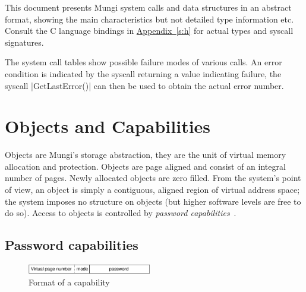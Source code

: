 \documentclass[a4paper,11pt,twoside,dvips]{report}
\begin{document}
This document presents Mungi system calls and data structures in an
abstract format, showing the main characteristics but not detailed type
information etc. Consult the C language bindings in
\hyperref[s:h]{Appendix~\ref*{s:h}} for actual types and syscall
signatures.

The system call tables show possible failure modes of various calls. An
error condition is indicated by the syscall returning a value indicating
failure, the syscall |GetLastError()| can then be used to obtain the
actual error number.

\chapter{\label{s:obj+caps}Objects and Capabilities}

Objects are Mungi's storage abstraction, they are the unit of virtual
memory allocation and protection. Objects are page aligned and consist
of an integral number of pages. Newly allocated objects are zero
filled. From the system's point of view, an object is simply a
contiguous, aligned region of virtual address space; the system imposes
no structure on objects (but higher software levels are free to do
so). Access to objects is controlled by \emph{password
capabilities}~\cite{Anderson_PW_86}.

\section{\label{s:caps}Password capabilities}

\begin{figure}[htb]
\begin{center}
\includegraphics[width=0.48\textwidth]{cap}
\end{center}
\caption{\label{f:cap}Format of a capability}
\end{figure}
\end{document}
